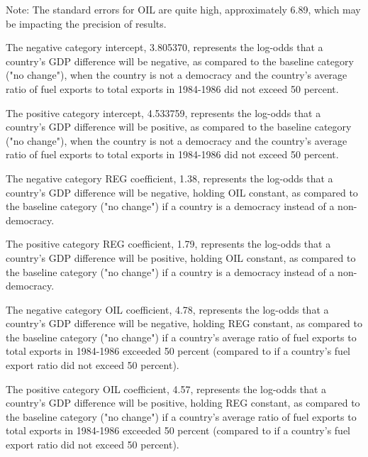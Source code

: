 \documentclass[12pt,letterpaper]{article}
\begin{document}
\noindent Note: The standard errors for OIL are quite high, approximately 6.89, which may be impacting the precision of results.

\vspace{.25cm}

\noindent The negative category intercept, 3.805370, represents the log-odds that a country's GDP difference will be negative, as compared to the baseline category ("no change"), when the country is not a democracy and the country's average ratio of fuel exports to total exports in 1984-1986 did not exceed 50 percent.

\vspace{.25cm}

\noindent The positive category intercept, 4.533759, represents the log-odds that a country's GDP difference will be positive, as compared to the baseline category ("no change"), when the country is not a democracy and the country's average ratio of fuel exports to total exports in 1984-1986 did not exceed 50 percent.

\vspace{.25cm}

\noindent The negative category REG coefficient, 1.38, represents the log-odds that a country's GDP difference will be negative, holding OIL constant, as compared to the baseline category ("no change") if a country is a democracy instead of a non-democracy.

\vspace{.25cm}

\noindent The positive category REG coefficient, 1.79, represents the log-odds that a country's GDP difference will be positive, holding OIL constant, as compared to the baseline category ("no change") if a country is a democracy instead of a non-democracy.

\vspace{.25cm}

\noindent The negative category OIL coefficient, 4.78, represents the log-odds that a country's GDP difference will be negative, holding REG constant, as compared to the baseline category ("no change") if a country's average ratio of fuel exports to total exports in 1984-1986 exceeded 50 percent (compared to if a country's fuel export ratio did not exceed 50 percent).

\vspace{.25cm}

\noindent The positive category OIL coefficient, 4.57, represents the log-odds that a country's GDP difference will be positive, holding REG constant, as compared to the baseline category ("no change") if a country's average ratio of fuel exports to total exports in 1984-1986 exceeded 50 percent (compared to if a country's fuel export ratio did not exceed 50 percent).
\end{document}
